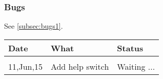 \subsubsection{Bugs}
See \autoref{subsec:bugs1}.
\bigskip

\begin{tabular}{l l l}
Date & What & Status\\
\hline \\
11,Jun,15  & Add help switch & Waiting ...\\
\end{tabular}